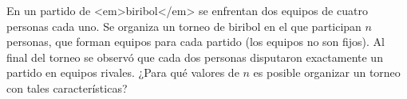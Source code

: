 En un partido de <em>biribol</em> se enfrentan dos equipos de cuatro personas cada uno. Se organiza un torneo de biribol en el que participan $n$ personas, que forman equipos para cada partido (los equipos no son fijos). Al final del torneo se observó que cada dos personas disputaron exactamente un partido en equipos rivales. ¿Para qué valores de $n$ es posible organizar un torneo con tales características?
